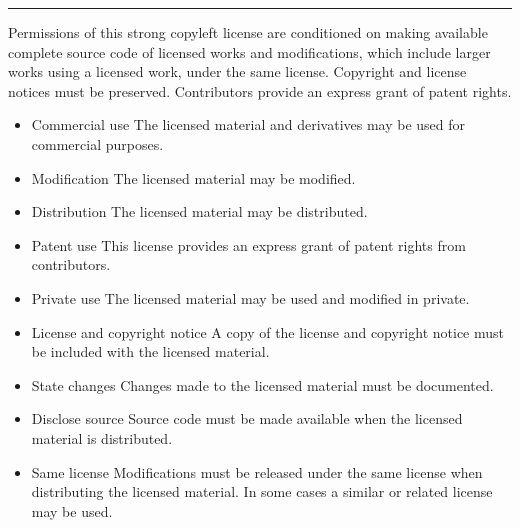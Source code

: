 \documentclass[letterpaper,10pt,english]{sphinxmanual}
\begin{document}
\bigskip\hrule\bigskip



Permissions of this strong copyleft license are conditioned on making available complete source code of licensed works and modifications, which include larger works using a licensed work, under the same license. Copyright and license notices must be preserved. Contributors provide an express grant of patent rights.

\vspace{10px}

\begin{itemize}
\item {}
Commercial use \textendash{} The licensed material and derivatives may be used for commercial purposes.

\item {}
Modification \textendash{} The licensed material may be modified.

\item {}
Distribution \textendash{} The licensed material may be distributed.

\item {}
Patent use \textendash{} This license provides an express grant of patent rights from contributors.

\item {}
Private use \textendash{} The licensed material may be used and modified in private.

\end{itemize}

\vspace{10px}

\begin{itemize}
\item {}
License and copyright notice \textendash{} A copy of the license and copyright notice must be included with the licensed material.

\item {}
State changes \textendash{} Changes made to the licensed material must be documented.

\item {}
Disclose source \textendash{} Source code must be made available when the licensed material is distributed.

\item {}
Same license \textendash{} Modifications must be released under the same license when distributing the licensed material. In some cases a similar or related license may be used.

\end{itemize}
\end{document}
